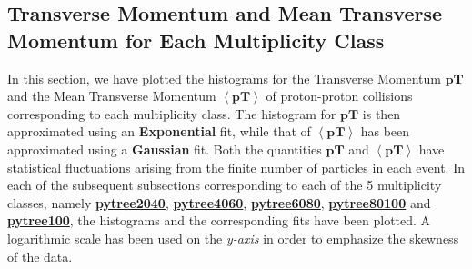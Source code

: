 \documentclass[letterpaper,aps,prc,superscriptaddress,nofootinbib,10pt,showpacs,floatfix]{revtex4-2}%
\begin{document}











\subsection{Transverse Momentum and Mean Transverse Momentum for Each Multiplicity Class}
In this section, we have plotted the histograms for the Transverse Momentum $\mathbf{pT}$ and the Mean Transverse Momentum $\mathbf{\left<pT\right>}$ of proton-proton collisions corresponding to each multiplicity class. The histogram for $\mathbf{pT}$ is then approximated using an \textbf{Exponential} fit, while that of $\mathbf{\left<pT\right>}$ has been approximated using a \textbf{Gaussian} fit. Both the quantities $\mathbf{pT}$ and $\mathbf{\left<pT\right>}$ have statistical fluctuations arising from the finite number of particles in each event. In each of the subsequent subsections corresponding to each of the 5 multiplicity classes, namely \hyperref[subsubsec:2040]{\textbf{pytree2040}}, \hyperref[subsubsec:4060]{\textbf{pytree4060}}, \hyperref[subsubsec:6080]{\textbf{pytree6080}}, \hyperref[subsubsec:80100]{\textbf{pytree80100}} and \hyperref[subsubsec:100]{\textbf{pytree100}}, the histograms and the corresponding fits have been plotted. A logarithmic scale has been used on the \emph{y-axis} in order to emphasize the skewness of the data. 
\end{document}

